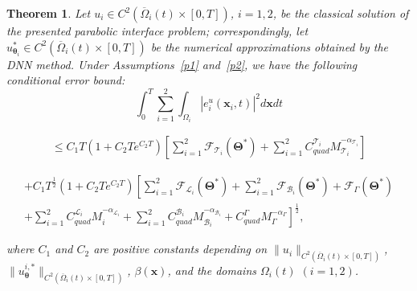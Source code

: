 \documentclass{article}
\newtheorem{theorem}{Theorem}[section]
\begin{document}
\begin{theorem}
Let $u_i \in C^2(\overline{\Omega}_i(t) \times [0, T])$, $i = 1, 2$, be the classical solution of the presented parabolic interface problem; correspondingly, let $u_{\boldsymbol{\theta}_i}^{*} \in C^2(\overline{\Omega}_i(t) \times [0, T])$ be the numerical approximations obtained by the DNN method. Under Assumptions~\ref{p1} and~\ref{p2}, we have the following conditional error bound:
\begin{equation}
\int_{0}^{T} \sum_{i=1}^{2} \int_{\Omega_i} |e_i^u(\boldsymbol{x}_i, t)|^2 d\boldsymbol{x}dt
\end{equation}

\begin{align}
\leq C_1 T(1+C_2Te^{C_2T}) \left[ \sum_{i=1}^{2} \mathcal{F}_{\mathcal{T}_i}(\boldsymbol{\Theta}^*) + \sum_{i=1}^{2} C_{quad}^{\mathcal{T}_i}M_{\mathcal{T}_i}^{-\alpha_{\mathcal{T}_i}} \right]
\end{align}

\begin{align}
+ C_1 T^{\frac{1}{2}}(1+C_2Te^{C_2T}) \left[ \sum_{i=1}^{2} \mathcal{F}_{\mathcal{L}_i}(\boldsymbol{\Theta}^*) + \sum_{i=1}^{2} \mathcal{F}_{\mathcal{B}_i}(\boldsymbol{\Theta}^*) + \mathcal{F}_{\Gamma}(\boldsymbol{\Theta}^*) \right.\\
\left. + \sum_{i=1}^{2} C_{quad}^{\mathcal{L}_i}M_{i}^{-\alpha_{\mathcal{L}_i}} + \sum_{i=1}^{2} C_{quad}^{\mathcal{B}_i}M_{\mathcal{B}_i}^{-\alpha_{\mathcal{B}_i}} + C_{quad}^{\Gamma}M_{\Gamma}^{-\alpha_{\Gamma}} \right]^{\frac{1}{2}},
\end{align}

where $C_1$ and $C_2$ are positive constants depending on $\|u_i\|_{C^2(\overline{\Omega}_i(t) \times [0,T])}$, $\|u_{\boldsymbol{\theta}}^{i,*}\|_{C^2(\overline{\Omega}_i(t) \times [0,T])}$, $\beta(\boldsymbol{x})$, and the domains $\Omega_i(t)$ $(i = 1, 2)$.
\end{theorem}
\end{document}
